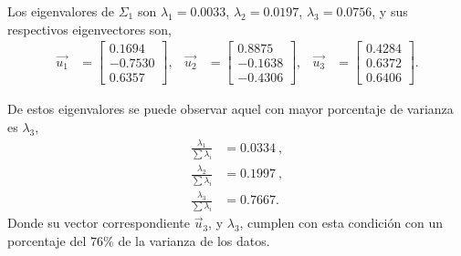 Los eigenvalores de $\Sigma_1$ son $\lambda_1 = 0.0033$, $\lambda_2 = 0.0197$, $\lambda_3 = 0.0756$, y sus respectivos eigenvectores son,
\begin{align*}
    \vec{u_1} & =
    \begin{bmatrix}
        0.1694 \\
        -0.7530 \\
        0.6357
    \end{bmatrix}, &
    \vec{u_2} & = 
    \begin{bmatrix}
        0.8875 \\
        -0.1638 \\
        -0.4306
    \end{bmatrix}, &
    \vec{u_3} & =
    \begin{bmatrix}
        0.4284 \\
        0.6372 \\
        0.6406
    \end{bmatrix}.
\end{align*}

De estos eigenvalores se puede observar aquel con mayor porcentaje de varianza es $\lambda_3$,
\begin{align*}
    \frac{\lambda_1}{\sum \lambda_i} & = 0.0334\ , \\
    \frac{\lambda_2}{\sum \lambda_i} & = 0.1997\ , \\
    \frac{\lambda_3}{\sum \lambda_i} & = 0.7667 .
\end{align*}
Donde su vector correspondiente $\vec{u}_3$, y $\lambda_3$, cumplen con esta condición con un porcentaje del $76\%$ de la varianza de los datos.

